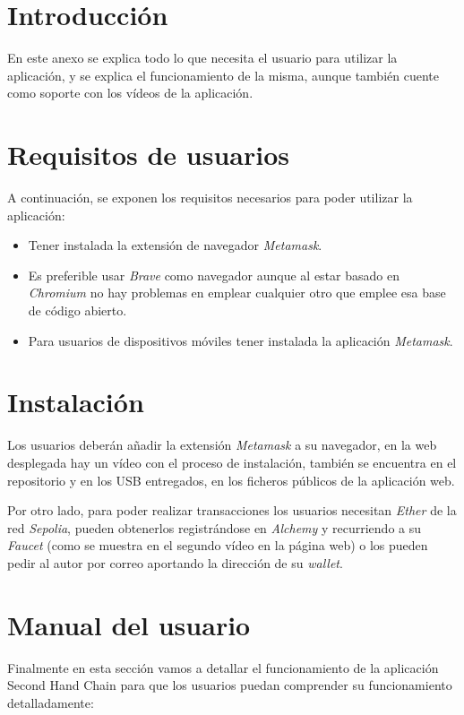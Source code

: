 
\section{Introducción}
En este anexo se explica todo lo que necesita el usuario para utilizar la aplicación, y se explica el funcionamiento de la misma, aunque también cuente como soporte con los vídeos de la aplicación.

\section{Requisitos de usuarios}
A continuación, se exponen los requisitos necesarios para poder utilizar la aplicación:
\begin{itemize}
    \item Tener instalada la extensión de navegador \textit{Metamask}.
    \item Es preferible usar \textit{Brave} como navegador aunque al estar basado en \textit{Chromium} no hay problemas en emplear cualquier otro que emplee esa base de código abierto.
    \item Para usuarios de dispositivos móviles tener instalada la aplicación \textit{Metamask}.
\end{itemize}

\section{Instalación}
Los usuarios deberán añadir la extensión \textit{Metamask} a su navegador, en la web desplegada hay un vídeo con el proceso de instalación, también se encuentra en el repositorio y en los USB entregados, en los ficheros públicos de la aplicación web.

Por otro lado, para poder realizar transacciones los usuarios necesitan \textit{Ether} de la red \textit{Sepolia}, pueden obtenerlos registrándose en \textit{Alchemy} y recurriendo a su \textit{Faucet} (como se muestra en el segundo vídeo en la página web) o los pueden pedir al autor por correo aportando la dirección de su \textit{wallet}.

\section{Manual del usuario}
Finalmente en esta sección vamos a detallar el funcionamiento de la aplicación Second Hand Chain para que los usuarios puedan comprender su funcionamiento detalladamente:

